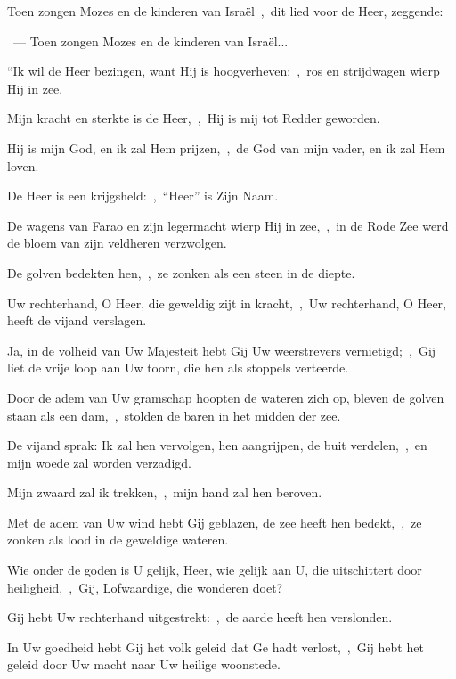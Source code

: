 \documentclass[12pt,twoside,a5paper]{article}
\begin{document}
\begin{halfparskip}
  Toen zongen Mozes en de kinderen van Israël~\sep\ dit lied voor de Heer, zeggende:

  ~---  Toen zongen Mozes en de kinderen van Israël...


  ``Ik wil de Heer bezingen, want Hij is hoogverheven:~\sep\ ros en strijdwagen wierp Hij in zee.

  Mijn kracht en sterkte is de Heer,~\sep\ Hij is mij tot Redder geworden.

  Hij is mijn God, en ik zal Hem prijzen,~\sep\ de God van mijn vader, en ik zal Hem loven.

  De Heer is een krijgsheld:~\sep\ ``Heer'' is Zijn Naam.

  De wagens van Farao en zijn legermacht wierp Hij in zee,~\sep\ in de Rode Zee werd de bloem van zijn veldheren verzwolgen.

  De golven bedekten hen,~\sep\ ze zonken als een steen in de diepte.
\end{halfparskip}

\begin{halfparskip}

  Uw rechterhand, O Heer, die geweldig zijt in kracht,~\sep\ Uw rechterhand, O Heer, heeft de vijand verslagen.

  Ja, in de volheid van Uw Majesteit hebt Gij Uw weerstrevers vernietigd;~\sep\ Gij liet de vrije loop aan Uw toorn, die hen als stoppels verteerde.

  Door de adem van Uw gramschap hoopten de wateren zich op, bleven de golven staan als een dam,~\sep\ stolden de baren in het midden der zee.

  De vijand sprak: Ik zal hen vervolgen, hen aangrijpen, de buit verdelen,~\sep\ en mijn woede zal worden verzadigd.

  Mijn zwaard zal ik trekken,~\sep\ mijn hand zal hen beroven.

  Met de adem van Uw wind hebt Gij geblazen, de zee heeft hen bedekt,~\sep\ ze zonken als lood in de geweldige wateren.

  Wie onder de goden is U gelijk, Heer, wie gelijk aan U, die uitschittert door heiligheid,~\sep\ Gij, Lofwaardige, die wonderen doet?

  Gij hebt Uw rechterhand uitgestrekt:~\sep\ de aarde heeft hen verslonden.

  In Uw goedheid hebt Gij het volk geleid dat Ge hadt verlost,~\sep\ Gij hebt het geleid door Uw macht naar Uw heilige woonstede.
\end{halfparskip}
\end{document}
